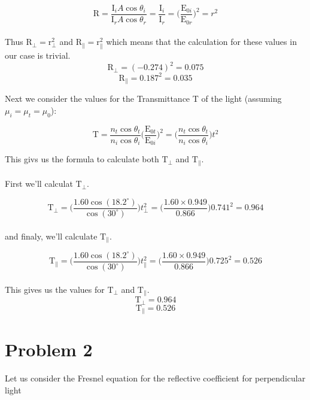 \documentclass{article}
\begin{document}
	\begin{equation*}
		\mathrm{R} = \dfrac{\mathrm{I}_iA\cos\theta_i}{\mathrm{I}_rA\cos\theta_r} = 
		\dfrac{\mathrm{I}_i}{\mathrm{I}_r} = \Big(\dfrac{\mathrm{E}_{0i}}{\mathrm{E}_{0r}}\Big)^2 = r^2
	\end{equation*}
	\\
	Thus $ \mathrm{R}_\bot = \mathrm{r}_\bot^2$ and $ \mathrm{R}_\parallel = \mathrm{r}_\parallel^2$ which means that the calculation for these
	values in our case is trivial.
	$$ \mathrm{R}_\bot = (-0.274)^2 = 0.075 $$
	$$ \mathrm{R}_\parallel = 0.187^2 = 0.035 $$

	Next we consider the values for the Transmittance T of the light (assuming $\mu_i = \mu_t = \mu_0$):
	
	\begin{equation*}
		\mathrm{T} = \dfrac{n_t\cos\theta_t}{n_i\cos\theta_i}\Big(\dfrac{\mathrm{E}_{0t}}{\mathrm{E}_{0i}}\Big)^2 = 
		\Big(\dfrac{n_t\cos\theta_t}{n_i\cos\theta_i}\Big)t^2
	\end{equation*}

	This givs us the formula to calculate both $\mathrm{T}_\bot$ and $\mathrm{T}_\parallel$. 
	\\
	\\
	First we'll calculat $\mathrm{T}_\bot$.
	
	\begin{equation*}
		\mathrm{T}_\bot = \Big(\dfrac{1.60\cos(18.2^\circ)}{\cos(30^\circ)}\Big)t_\bot^2 = 
		\Big(\dfrac{1.60 \times 0.949}{0.866}\Big)0.741^2 = 0.964
	\end{equation*}
	\\
	and finaly, we'll calculate $\mathrm{T}_\parallel$.
	
	\begin{equation*}
		\mathrm{T}_\parallel = \Big(\dfrac{1.60\cos(18.2^\circ)}{\cos(30^\circ)}\Big)t_\parallel^2 = 
		\Big(\dfrac{1.60 \times 0.949}{0.866}\Big)0.725^2 = 0.526
	\end{equation*}
	\\
	This gives us the values for $\mathrm{T}_\bot$ and $\mathrm{T}_\parallel$. 
	$$ \mathrm{T}_\bot = 0.964 $$
	$$ \mathrm{T}_\parallel = 0.526 $$

	\pagebreak
	
	\section*{Problem 2}
	
	Let us consider the Fresnel equation for the reflective coefficient for perpendicular light
	
\end{document}
